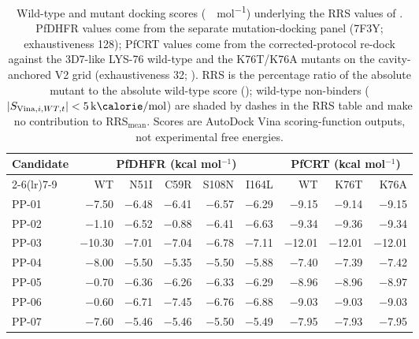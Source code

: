 
\begin{table}[ht!]
\centering
\caption{Wild-type and mutant docking scores (\si{\kilo\calorie\per\mole}) underlying the RRS values of . PfDHFR values come from the separate mutation-docking panel (7F3Y; exhaustiveness \num{128}); PfCRT values come from the corrected-protocol re-dock against the 3D7-like LYS-76 wild-type and the K76T/K76A mutants on the cavity-anchored V2 grid (exhaustiveness \num{32}; ). RRS is the percentage ratio of the absolute mutant to the absolute wild-type score (); wild-type non-binders ($|S_{\mathrm{Vina},i,WT,t}|<\qty{5}{\kilo\calorie\per\mole}$) are shaded by dashes in the RRS table and make no contribution to RRS$_{\mathrm{mean}}$. Scores are AutoDock Vina scoring-function outputs, not experimental free energies.}
\label{tab:sm_wt_mutant_scores}
\small
\begin{tabular}{@{}lrrrrrrrr@{}}
\toprule
Candidate & \multicolumn{5}{c}{PfDHFR (kcal mol$^{-1}$)} & \multicolumn{3}{c}{PfCRT (kcal mol$^{-1}$)} \\
\cmidrule(lr){2-6}\cmidrule(lr){7-9}
 & WT & N51I & C59R & S108N & I164L & WT & K76T & K76A \\
\midrule
PP-01 & \num{-7.50} & \num{-6.48} & \num{-6.41} & \num{-6.57} & \num{-6.29} & \num{-9.15} & \num{-9.14} & \num{-9.15} \\
PP-02 & \num{-1.10} & \num{-6.52} & \num{-0.88} & \num{-6.41} & \num{-6.63} & \num{-9.34} & \num{-9.36} & \num{-9.34} \\
PP-03 & \num{-10.30} & \num{-7.01} & \num{-7.04} & \num{-6.78} & \num{-7.11} & \num{-12.01} & \num{-12.01} & \num{-12.01} \\
PP-04 & \num{-8.00} & \num{-5.50} & \num{-5.35} & \num{-5.50} & \num{-5.88} & \num{-7.40} & \num{-7.39} & \num{-7.42} \\
PP-05 & \num{-0.70} & \num{-6.36} & \num{-6.26} & \num{-6.33} & \num{-6.29} & \num{-8.96} & \num{-8.96} & \num{-8.97} \\
PP-06 & \num{-0.60} & \num{-6.71} & \num{-7.45} & \num{-6.76} & \num{-6.88} & \num{-9.03} & \num{-9.03} & \num{-9.03} \\
PP-07 & \num{-7.60} & \num{-5.46} & \num{-5.46} & \num{-5.50} & \num{-5.49} & \num{-7.95} & \num{-7.93} & \num{-7.95} \\

\end{tabular}
\end{table}
